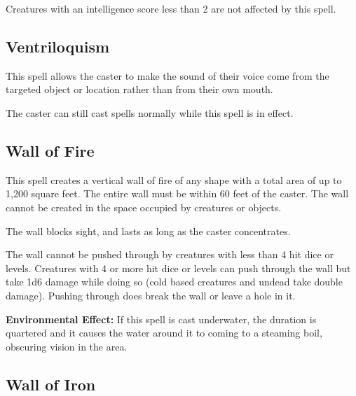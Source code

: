 \begin{multicols*}{2}
Creatures with an intelligence score less than 2 are not affected by this spell.

\subsection{Ventriloquism}\label{spell:Ventriloquism}

This spell allows the caster to make the sound of their voice come from the targeted object or location rather than from their own mouth.

The caster can still cast spells normally while this spell is in effect.

\subsection{Wall of Fire}\label{spell:Wall of Fire}

This spell creates a vertical wall of fire of any shape with a total area of up to 1,200 square feet. The entire wall must be within 60 feet of the caster. The wall cannot be created in the space occupied by creatures or objects.

The wall blocks sight, and lasts as long as the caster concentrates.

The wall cannot be pushed through by creatures with less than 4 hit dice or levels. Creatures with 4 or more hit dice or levels can push through the wall but take 1d6 damage while doing so (cold based creatures and undead take double damage). Pushing through does break the wall or leave a hole in it.

\textbf{Environmental Effect:} If this spell is cast underwater, the duration is quartered and it causes the water around it to coming to a steaming boil, obscuring vision in the area.

\subsection{Wall of Iron}\label{spell:Wall of Iron}
\end{multicols*}
